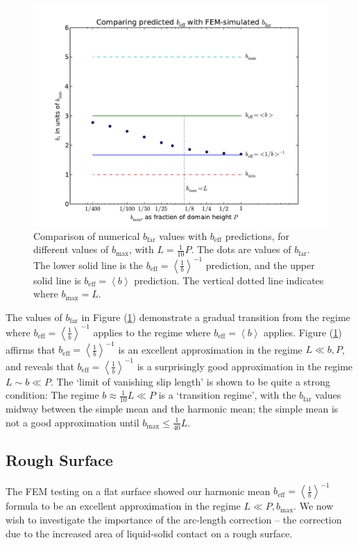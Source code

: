 \documentclass[12pt, a4paper, twoside, openright]{book}
\newcommand{\beff}{\ensuremath{b_{\mathrm{eff}}}}
\newcommand{\bmax}{\ensuremath{b_{\mathrm{max}}}}
\newcommand{\bfar}{\ensuremath{b_{\mathrm{far}}}}
\newcommand{\beffh}{\ensuremath{b_{\mathrm{eff}}} = \left< \frac{1}{b} \right>^{-1} }
\newcommand{\beffm}{\ensuremath{b_{\mathrm{eff}}} = \left< b \right> }
\begin{document}
\begin{figure}[ht]
\includegraphics[scale=0.595]{Lund_Thesis_FEM_plot_flat_b}
\caption{Comparison of numerical $\bfar$ values with $\beff$ predictions, for different values of $\bmax$, with $L = \frac{1}{10}P$. The dots are values of $\bfar$. The lower solid line is the $\beffh$ prediction, and the upper solid line is $\beffm$ prediction.  The vertical dotted line indicates where $\bmax = L$.}\label{FEMplotflatb}
\end{figure}

The values of $\bfar$ in Figure (\ref{FEMplotflatb}) demonstrate a gradual transition from the regime where $\beffh$ applies to the regime where $\beffm$ applies.
Figure (\ref{FEMplotflatb}) affirms that $\beffh$ is an excellent approximation in the regime $L \ll b,P$, and reveals that $\beffh$ is a surprisingly good approximation in the regime $ L \sim b \ll P$.
 The `limit of vanishing slip length' is shown to be quite a strong condition: The regime $b \approx \frac{1}{1	0} L \ll P$ is a `transition regime', with the $\bfar$ values midway between the simple mean and the harmonic mean; the simple mean is not a good approximation until $\bmax \leq \frac{1}{40}L$.

\clearpage
\subsection{Rough Surface}

The FEM testing on a flat surface showed our harmonic mean $\beffh$ formula to be an excellent approximation in the regime $L \ll P, \bmax$.  We now wish to investigate the importance of the arc-length correction -- the correction due to the increased area of liquid-solid contact on a rough surface.
\end{document}
